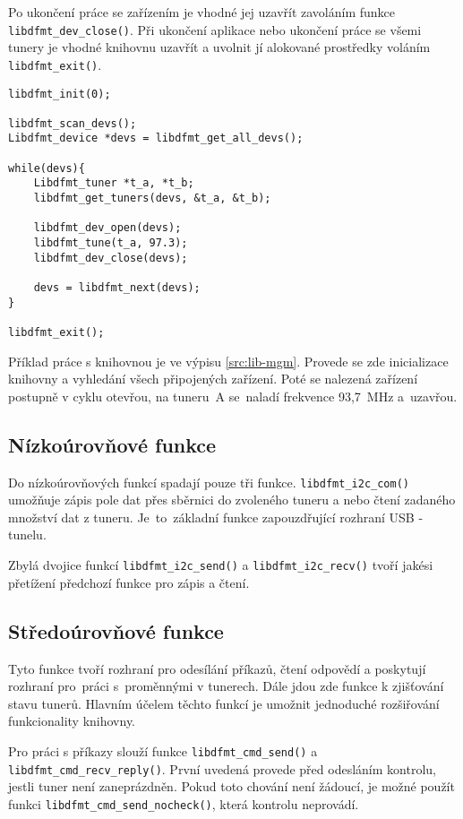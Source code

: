 Po ukončení práce se zařízením je vhodné jej uzavřít zavoláním funkce \verb|libdfmt_dev_close()|. Při ukončení aplikace nebo ukončení práce se všemi tunery je vhodné knihovnu uzavřít a uvolnit jí alokované prostředky voláním \verb|libdfmt_exit()|.

\begin{lstlisting}[label=src:lib-mgm, caption=Ukázka práce s knihovnou.]
libdfmt_init(0);

libdfmt_scan_devs();
Libdfmt_device *devs = libdfmt_get_all_devs();

while(devs){
	Libdfmt_tuner *t_a, *t_b;
	libdfmt_get_tuners(devs, &t_a, &t_b);

	libdfmt_dev_open(devs);
	libdfmt_tune(t_a, 97.3);
	libdfmt_dev_close(devs);

	devs = libdfmt_next(devs);
}

libdfmt_exit();
\end{lstlisting}

Příklad práce s knihovnou je ve výpisu \ref{src:lib-mgm}. Provede se zde inicializace knihovny a vyhledání všech připojených zařízení. Poté se nalezená zařízení postupně v cyklu otevřou, na tuneru~A se~naladí frekvence 93,7~MHz a~uzavřou.

\subsection{Nízkoúrovňové funkce}
Do nízkoúrovňových funkcí spadají pouze tři funkce. \verb|libdfmt_i2c_com()| umožňuje zápis pole dat přes \iic sběrnici do zvoleného tuneru a nebo čtení zadaného množství dat z tuneru. Je~to~základní funkce zapouzdřující rozhraní USB - \iic tunelu.

Zbylá dvojice funkcí \verb|libdfmt_i2c_send()| a \verb|libdfmt_i2c_recv()|  tvoří jakési přetížení předchozí funkce pro zápis a čtení.

\subsection{Středoúrovňové funkce}

Tyto funkce tvoří rozhraní pro odesílání příkazů, čtení odpovědí a poskytují rozhraní pro~práci s~proměnnými v tunerech. Dále jdou zde funkce k zjišťování stavu tunerů. Hlavním účelem těchto funkcí je umožnit jednoduché rozšiřování funkcionality knihovny.

Pro práci s příkazy slouží funkce \verb|libdfmt_cmd_send()| a \verb|libdfmt_cmd_recv_reply()|. První uvedená provede před odesláním kontrolu, jestli tuner není zaneprázdněn. Pokud toto chování není žádoucí, je možné použít funkci \verb|libdfmt_cmd_send_nocheck()|, která kontrolu neprovádí.

